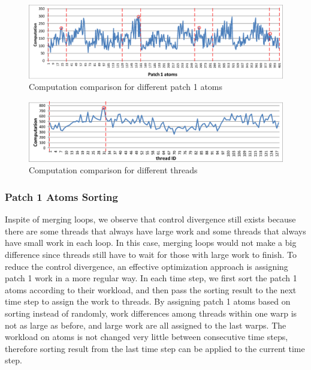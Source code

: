 \begin{figure}[h]
\centering
\setlength{\abovecaptionskip}{-1pt}
\setlength{\belowcaptionskip}{-2pt}
\includegraphics[width=6.0in]{figs/patch1_count.eps}
\caption{Computation comparison for different patch 1 atoms}
\label{figs:patch1-count}
\vspace{-0.5cm}
\end{figure}

\begin{figure}[h]
\centering
\setlength{\abovecaptionskip}{-1pt}
\setlength{\belowcaptionskip}{-2pt}
\includegraphics[width=6.0in]{figs/thread_count.eps}
\caption{Computation comparison for different threads}
\label{figs:thread-count}
\vspace{-0.5cm}
\end{figure}

\subsubsection{Patch 1 Atoms Sorting}

Inspite of merging loops, we observe that control divergence still exists because there are some threads that always have large work and some threads
that always have small work in each loop. In this case, merging loops would not make a big difference since threads still have to wait for those with
large work to finish. To reduce the control divergence, an effective optimization approach is assigning patch 1 work in a more regular way.
In each time step, we first sort the patch 1 atoms according to their workload, and then pass the sorting result to the next time step to assign the work to threads.
By assigning patch 1 atoms based on sorting instead of randomly, work differences among threads within one warp is not as large as before, and large work
are all assigned to the last warps. The workload on atoms is not changed very little between consecutive time steps, therefore sorting result from the last time step
can be applied to the current time step. 

